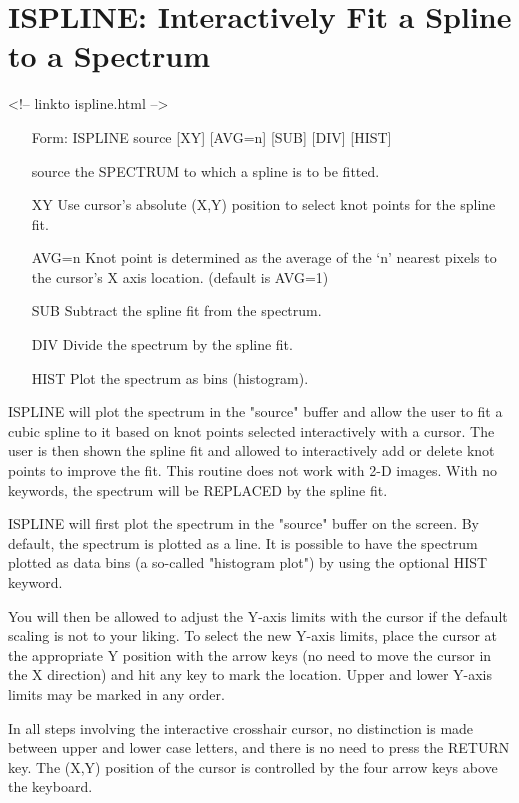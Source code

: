\section{ISPLINE: Interactively Fit a Spline to a Spectrum}
\begin{rawhtml}
<!-- linkto ispline.html -->
\end{rawhtml}
\begin{itemize} 
  \item[Form: ISPLINE source {[XY]} {[AVG=n]} {[SUB]} {[DIV]} {[HIST]}\hfill]{}
  \item[source]{the SPECTRUM to which a spline is to be fitted.}
  \item[XY]{Use cursor's absolute (X,Y) position to select
       knot points for the spline fit.}
  \item[AVG=n]{Knot point is determined as the average of the
       `n' nearest pixels to the cursor's X axis location. (default is AVG=1)}
  \item[SUB]{Subtract the spline fit from the spectrum.}
  \item[DIV]{Divide the spectrum by the spline fit.}
  \item[HIST]{Plot the spectrum as bins (histogram).}
\end{itemize} 
 
ISPLINE will plot the spectrum in the "source" buffer and allow the user to
fit a cubic spline to it based on knot points selected interactively with a
cursor.  The user is then shown the spline fit and allowed to interactively
add or delete knot points to improve the fit.  This routine does not work
with 2-D images.  With no keywords, the spectrum will be REPLACED by the
spline fit.

ISPLINE will first plot the spectrum in the "source" buffer on the screen.
By default, the spectrum is plotted as a line.  It is possible to have the
spectrum plotted as data bins (a so-called "histogram plot") by using the
optional HIST keyword.
 
You will then be allowed to adjust the Y-axis limits with the cursor if the
default scaling is not to your liking. To select the new Y-axis limits,
place the cursor at the appropriate Y position with the arrow keys (no need
to move the cursor in the X direction) and hit any key to mark the
location.  Upper and lower Y-axis limits may be marked in any order.
 
In all steps involving the interactive crosshair cursor, no distinction is
made between upper and lower case letters, and there is no need to press
the RETURN key.  The (X,Y) position of the cursor is controlled by the four
arrow keys above the keyboard.


